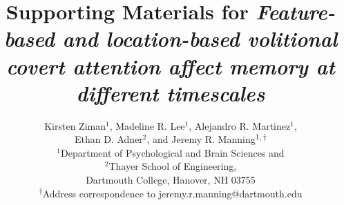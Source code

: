 \documentclass{article}
\begin{document}
\title{Supporting Materials for \textit{Feature-based and location-based volitional covert attention affect memory at different timescales}}

\author{Kirsten Ziman$^1$,
Madeline R. Lee$^1$,
Alejandro R. Martinez$^1$,\\
Ethan D. Adner$^2$,
and
Jeremy R. Manning\textsuperscript{$1, \dagger$}\\[0.1in]$^1$Department of Psychological and Brain Sciences and\\
$^2$Thayer School of Engineering,\\
Dartmouth College, Hanover, NH 03755\\
\textsuperscript{$\dagger$}Address correspondence to jeremy.r.manning@dartmouth.edu}

  \maketitle

  \renewcommand{\thefigure}{S\arabic{figure}}
  

\end{document}
